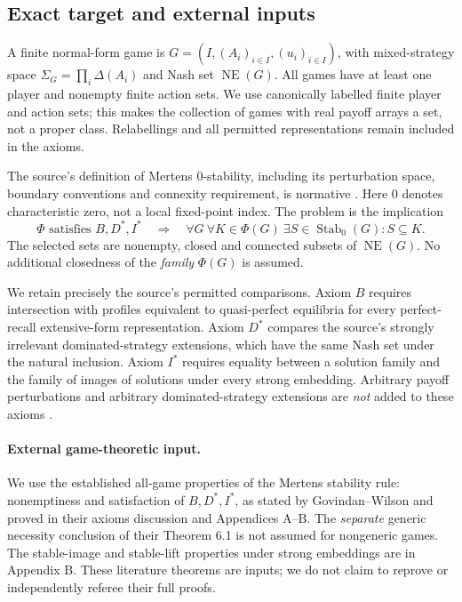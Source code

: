\documentclass[11pt]{article}
\theoremstyle{definition}
\newcommand{\NE}{\operatorname{NE}}
\newcommand{\Stab}{\operatorname{Stab}_0}
\begin{document}
\subsection{Exact target and external inputs}
A finite normal-form game is $G=(I,(A_i)_{i\in I},(u_i)_{i\in I})$,
with mixed-strategy space $\Sigma_G=\prod_i\Delta(A_i)$ and Nash set
$\NE(G)$. All games have at least one player and nonempty finite action sets.
We use canonically labelled finite player and action sets; this makes the
collection of games with real payoff arrays a set, not a proper class.
Relabellings and all permitted representations remain included in the axioms.

The source's definition of Mertens $0$-stability, including its perturbation
space, boundary conventions and connexity requirement, is normative
\cite[Definition 2.4]{gw}. Here $0$ denotes characteristic zero, not a local
fixed-point index. The problem is the implication
\begin{equation}\label{eq:target}
 \Phi\text{ satisfies }B,D^*,I^*
 \quad\Longrightarrow\quad
 \forall G\ \forall K\in\Phi(G)\ \exists S\in\Stab(G): S\subseteq K.
\end{equation}
The selected sets are nonempty, closed and connected subsets of $\NE(G)$.
No additional closedness of the \emph{family} $\Phi(G)$ is assumed.

We retain precisely the source's permitted comparisons. Axiom $B$ requires
intersection with profiles equivalent to quasi-perfect equilibria for every
perfect-recall extensive-form representation. Axiom $D^*$ compares the source's
strongly irrelevant dominated-strategy extensions, which have the same Nash
set under the natural inclusion. Axiom $I^*$ requires equality between a
solution family and the family of images of solutions under every strong
embedding. Arbitrary payoff perturbations and arbitrary dominated-strategy
extensions are \emph{not} added to these axioms
\cite[Axioms 3.1, 4.7, 5.4; Definitions 4.4, 5.2]{gw}.

\paragraph{External game-theoretic input.}
We use the established all-game properties of the Mertens stability
rule: nonemptiness and satisfaction of $B,D^*,I^*$, as stated by
Govindan--Wilson and proved in their axioms discussion and Appendices A--B.
The \emph{separate} generic necessity conclusion of their Theorem 6.1
is not assumed for nongeneric games. The stable-image and stable-lift
properties under strong embeddings are in Appendix B. These literature theorems are inputs;
we do not claim to reprove or independently referee their full proofs.
\end{document}
